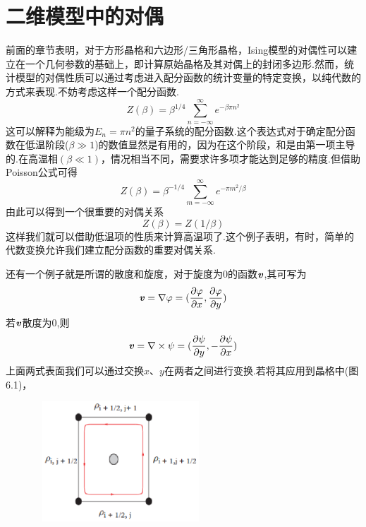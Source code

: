 \documentclass[a4paper]{book}
\newcommand{\xtjc}[1]{\textbf{\textit{#1}}}
\begin{document}
\chapter{二维模型中的对偶}
前面的章节表明，对于方形晶格和六边形/三角形晶格，Ising模型的对偶性可以建立在一个几何参数的基础上，即计算原始晶格及其对偶上的封闭多边形.然而，统计模型的对偶性质可以通过考虑进入配分函数的统计变量的特定变换，以纯代数的方式来表现.不妨考虑这样一个配分函数.
\begin{equation}
	Z(\beta)=\beta^{1/4}\sum_{n=-\infty}^{\infty}e^{-\beta\pi n^2}
\end{equation}
这可以解释为能级为$E_n=\pi n^2$的量子系统的配分函数.这个表达式对于确定配分函数在低温阶段($\beta\gg1$)的数值显然是有用的，因为在这个阶段，和是由第一项主导的.在高温相$(\beta\ll1)$，情况相当不同，需要求许多项才能达到足够的精度.但借助Poisson公式可得
\begin{equation}
	Z(\beta)=\beta^{-1/4}\sum_{m=-\infty}^{\infty}e^{-\pi m^2/\beta}
\end{equation}
由此可以得到一个很重要的对偶关系
\begin{equation}
	Z(\beta)=Z(1/\beta)
\end{equation}
这样我们就可以借助低温项的性质来计算高温项了.这个例子表明，有时，简单的代数变换允许我们建立配分函数的重要对偶关系.\par 
还有一个例子就是所谓的散度和旋度，对于旋度为0的函数$\xtjc{v}$,其可写为
\begin{equation}
	\xtjc{v}=\nabla \varphi=(\frac{\partial \varphi}{\partial x},\frac{\partial \varphi}{\partial y})
\end{equation}
若$\xtjc{v}$散度为0,则
\begin{equation}
	\xtjc{v}=\nabla \times \psi=(\frac{\partial \psi}{\partial y},-\frac{\partial \psi}{\partial x})
\end{equation}
上面两式表面我们可以通过交换$x$、$y$在两者之间进行变换.若将其应用到晶格中(图6.1)，
\begin{figure}[!h]
	\centering
	\includegraphics[width=6.5cm,height=4.5cm]{figures/7.eps}
	\caption{}
\end{figure}
\end{document}
